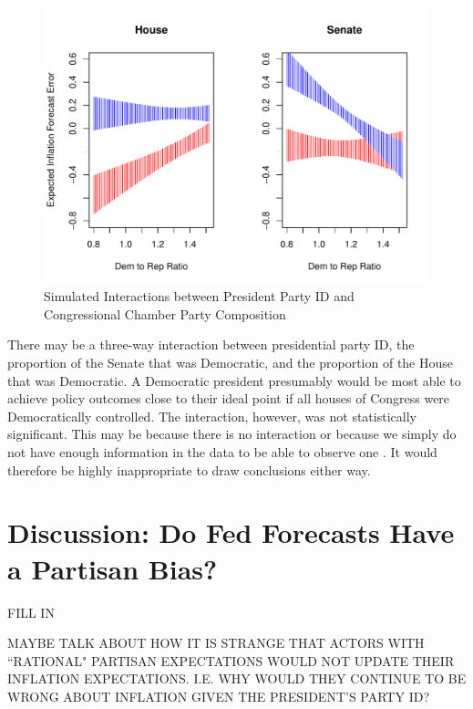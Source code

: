 \documentclass[a4paper]{article}\usepackage{graphicx, color}
\newenvironment{knitrout}{}{} %
\begin{document}
\begin{figure}[t]
    \caption{Simulated Interactions between President Party ID and Congressional Chamber Party Composition}
    \label{InteractionPlots}
    \begin{center}

\begin{knitrout}
\color{fgcolor}\includegraphics[width=0.95\linewidth]{figure/InterPlots} 
\end{knitrout}


    \end{center}
\end{figure}

There may be a three-way interaction between presidential party ID, the proportion of the Senate that was Democratic, and the proportion of the House that was Democratic. A Democratic president presumably would be most able to achieve policy outcomes close to their ideal point if all houses of Congress were Democratically controlled. The interaction, however, was not statistically significant. This may be because there is no interaction or because we simply do not have enough information in the data to be able to observe one \citep[see][]{Brambor2006}. It would therefore be highly inappropriate to draw conclusions either way.


\section*{Discussion: Do Fed Forecasts Have a Partisan Bias?}

FILL IN

MAYBE TALK ABOUT HOW IT IS STRANGE THAT ACTORS WITH ``RATIONAL" PARTISAN EXPECTATIONS WOULD NOT UPDATE THEIR INFLATION EXPECTATIONS. I.E. WHY WOULD THEY CONTINUE TO BE WRONG ABOUT INFLATION GIVEN THE PRESIDENT'S PARTY ID?
\end{document}

